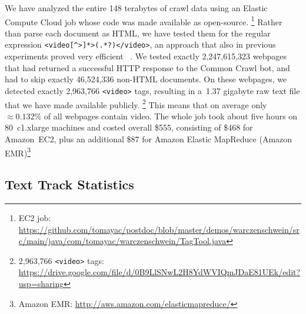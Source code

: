 \documentclass{sig-alternate}
\newcommand{\inlinelistingsize}{\fontsize{8pt}{11pt}}
\let\oldurl\url
\renewcommand{\url}[1]{\inlinelistingsize\oldurl{#1}}
\begin{document}
We have analyzed the entire 148 terabytes of crawl data
using an Elastic Compute Cloud job
whose code was made available as open-source.%
\footnote{EC2 job:
\url{https://github.com/tomayac/postdoc/blob/master/demos/warczenschwein/src/main/java/com/tomayac/warczenschwein/TagTool.java}}
Rather than parse each document as HTML,
we have tested them for the regular expression
\texttt{<video[\^{}>]*>(.*?)</video>},
an approach that also in previous experiments
proved very efficient%
~\cite{bizer2013deployment,muhleisen2012web}.
We tested exactly 2,247,615,323 webpages
that had returned a successful HTTP response to the Common Crawl bot,
and had to skip exactly 46,524,336  non-HTML documents.
On these webpages, we detected exactly
2,963,766 \texttt{<video>} tags,
resulting in a~1.37 gigabyte raw text file
that we have made available publicly.%
\footnote{2,963,766 \texttt{<video>} tags: \url{https://drive.google.com/file/d/0B9LlSNwL2H8YdWVIQmJDaE81UEk/edit?usp=sharing}}
This means that on average only ${\approx}0.132\%$ of all webpages contain video.
The whole job took about five hours on
80~c1.xlarge machines and costed overall \$555,
consisting of \$468 for Amazon~EC2,
plus an additional \$87 for Amazon Elastic MapReduce
 (Amazon EMR)\footnote{Amazon EMR:
\url{http://aws.amazon.com/elasticmapreduce/}}

\subsection{Text Track Statistics}
\label{sec:text-track-statistics}
\end{document}
